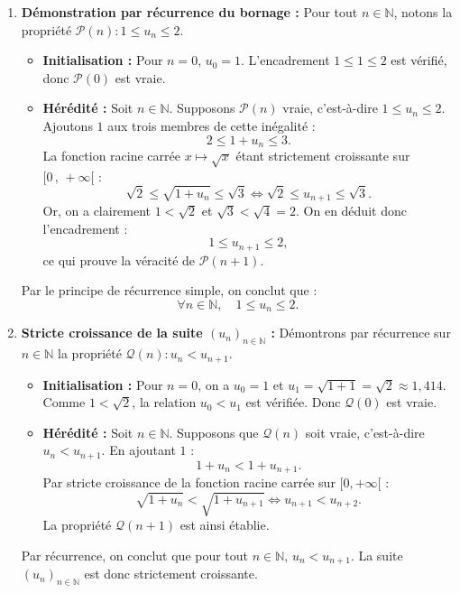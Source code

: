 \documentclass[11pt,a4paper]{article}
\newcommand{\N}{\mathbb{N}}
\begin{document}
\begin{correctionbox}
\begin{enumerate}
    \item \textbf{Démonstration par récurrence du bornage :}
    Pour tout $n \in \N$, notons la propriété $\mathcal{P}(n) : 1 \le u_n \le 2$.
    \begin{itemize}
        \item \textbf{Initialisation :} Pour $n = 0$, $u_0 = 1$. L'encadrement $1 \le 1 \le 2$ est vérifié, donc $\mathcal{P}(0)$ est vraie.
        \item \textbf{Hérédité :} Soit $n \in \N$. Supposons $\mathcal{P}(n)$ vraie, c'est-à-dire $1 \le u_n \le 2$.
        Ajoutons $1$ aux trois membres de cette inégalité :
        \[
        2 \le 1 + u_n \le 3.
        \]
        La fonction racine carrée $x \mapsto \sqrt{x}$ étant strictement croissante sur $[0\,,\, +\infty[$ :
        \[
        \sqrt{2} \le \sqrt{1 + u_n} \le \sqrt{3} \iff \sqrt{2} \le u_{n+1} \le \sqrt{3}.
        \]
        Or, on a clairement $1 < \sqrt{2}$ et $\sqrt{3} < \sqrt{4} = 2$.
        On en déduit donc l'encadrement :
        \[
        1 \le u_{n+1} \le 2,
        \]
        ce qui prouve la véracité de $\mathcal{P}(n+1)$.
    \end{itemize}
    Par le principe de récurrence simple, on conclut que :
    \[
    \forall n \in \N, \quad 1 \le u_n \le 2.
    \]

    \item \textbf{Stricte croissance de la suite $(u_n)_{n \in \N}$ :}
    Démontrons par récurrence sur $n \in \N$ la propriété $\mathcal{Q}(n) : u_n < u_{n+1}$.
    \begin{itemize}
        \item \textbf{Initialisation :} Pour $n = 0$, on a $u_0 = 1$ et $u_1 = \sqrt{1 + 1} = \sqrt{2} \approx 1{,}414$.
        Comme $1 < \sqrt{2}$, la relation $u_0 < u_1$ est vérifiée. Donc $\mathcal{Q}(0)$ est vraie.
        \item \textbf{Hérédité :} Soit $n \in \N$. Supposons que $\mathcal{Q}(n)$ soit vraie, c'est-à-dire $u_n < u_{n+1}$.
        En ajoutant $1$ :
        \[
        1 + u_n < 1 + u_{n+1}.
        \]
        Par stricte croissance de la fonction racine carrée sur $[0, +\infty[$ :
        \[
        \sqrt{1 + u_n} < \sqrt{1 + u_{n+1}} \iff u_{n+1} < u_{n+2}.
        \]
        La propriété $\mathcal{Q}(n+1)$ est ainsi établie.
    \end{itemize}
    Par récurrence, on conclut que pour tout $n \in \N$, $u_n < u_{n+1}$.
    La suite $(u_n)_{n \in \N}$ est donc strictement croissante.


\end{enumerate}
\end{correctionbox}
\end{document}
